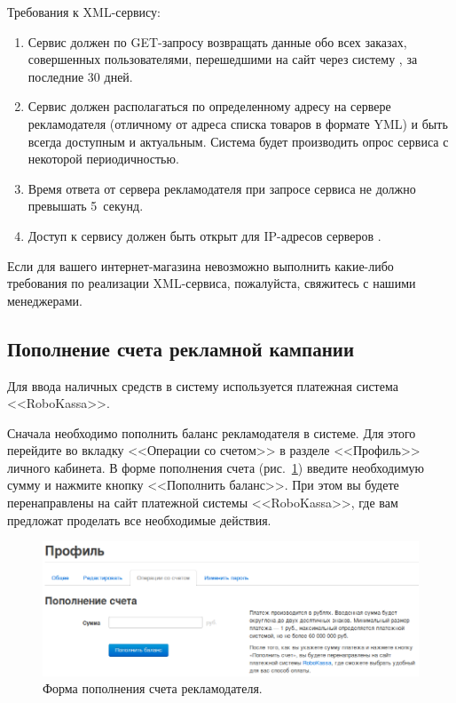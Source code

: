 \documentclass[a4paper,12pt]{article}
\begin{document}
Требования к XML-сервису:
\begin{enumerate}
\item Сервис должен по GET-запросу возвращать данные обо всех заказах, совершенных пользователями, перешедшими на сайт через систему \heymoose{}, за последние 30 дней.
\item Сервис должен располагаться по определенному адресу на сервере рекламодателя (отличному от адреса списка товаров в формате YML) и быть всегда доступным и актуальным. Система \heymoose{} будет производить опрос сервиса с некоторой периодичностью.
\item Время ответа от сервера рекламодателя при запросе сервиса не должно превышать 5~секунд.
\item Доступ к сервису должен быть открыт для IP-адресов серверов \heymoose{}.
\end{enumerate}

Если для вашего интернет-магазина невозможно выполнить какие-либо требования по реализации XML-сервиса, пожалуйста, свяжитесь с нашими менеджерами.

\subsection{Пополнение счета рекламной кампании}

Для ввода наличных средств в систему \heymoose{} используется платежная система <<RoboKassa>>.

Сначала необходимо пополнить баланс рекламодателя в системе. Для этого перейдите во вкладку <<Операции со счетом>> в разделе <<Профиль>> личного кабинета. В форме пополнения счета (рис.~\ref{fig:operations}) введите необходимую сумму и нажмите кнопку <<Пополнить баланс>>. При этом вы будете перенаправлены на сайт платежной системы <<RoboKassa>>, где вам предложат проделать все необходимые действия.

\begin{figure}[!ht]
\centering
\includegraphics[width=\textwidth]{include/operations.png}
\caption{Форма пополнения счета рекламодателя.}
\label{fig:operations}
\end{figure}
\end{document}
